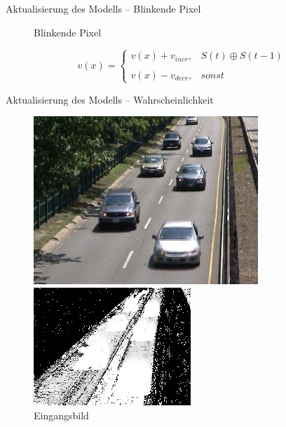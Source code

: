 \documentclass[hyperref={pdfpagelabels=false}]{beamer}
\begin{document}
\begin{frame}[t]{Aktualisierung des Modells -- Blinkende Pixel}
\begin{figure}
\begin{minipage}{0.45\linewidth}
			\caption*{Blinkende Pixel}
		\end{minipage}
	\end{figure}
	\bigskip
	\begin{equation*}
		v(x)= 	\left\{
				\begin{array}{ll} 
					v(x) + v_{incr}, &  S(t) \oplus S(t-1) \\
					\\
					v(x) - v_{decr}, & sonst
				\end{array}
			\right .
	\end{equation*}
\end{frame}

\begin{frame}[t]{Aktualisierung des Modells -- Wahrscheinlichkeit}
	\vspace{1.65em}
	\begin{figure}
		\centering
		\begin{minipage}{0.45\linewidth}
			\includegraphics[width=1\linewidth]{Abbildungen/Eingang3.jpg}
			\caption*{Eingangsbild}
		\end{minipage}
		\begin{minipage}{0.45\linewidth}
			\includegraphics[width=1\linewidth]{Abbildungen/threshold.jpg}

\end{minipage}
\end{figure}
\end{frame}
\end{document}
